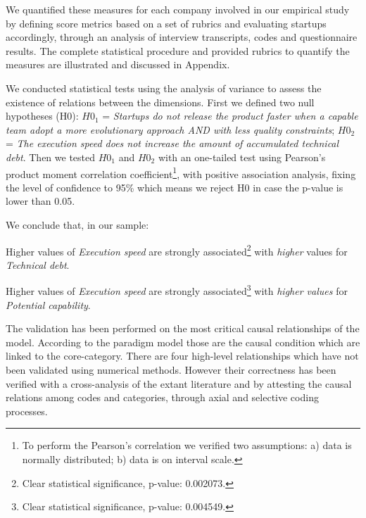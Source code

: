 \documentclass[10pt,journal,letterpaper,compsoc]{IEEEtran}
\begin{document}
We quantified these measures for each company involved in our empirical study 
by defining score metrics based on a set of rubrics and evaluating startups 
accordingly, through an analysis of interview transcripts, codes and 
questionnaire results. The complete statistical procedure and provided rubrics 
to quantify the measures are illustrated and discussed in Appendix.

We conducted statistical tests using the analysis of variance to assess the existence of relations between the dimensions. First we defined two null hypotheses (H0): $H0_1$ = \textit{Startups do not release the product faster when a capable team adopt a more evolutionary approach AND with less quality constraints}; $H0_2$ = \textit{The execution speed does not increase the amount of accumulated technical debt}. Then we tested $H0_1$ and $H0_2$  with an one-tailed test using Pearson's product moment correlation coefficient\footnote{To perform the Pearson's correlation we verified two assumptions: a) data is normally distributed; b) data is on interval scale.}, with positive association analysis, fixing the level of confidence to 95\% which means we reject H0 in case the p-value is lower than 0.05.

We conclude that, in our sample:
\par\vspace {0.4cm}
\begin{compactenum}
\item Higher values of \textit{Execution speed} are strongly associated\footnote{Clear statistical significance, p-value: 0.002073.} with \textit{higher} values for  \textit{Technical debt}.

\item Higher values of  \textit{Execution speed}  are strongly associated\footnote{Clear statistical significance, p-value: 0.004549.} with  \textit{higher values} for  \textit{Potential capability}.
\end{compactenum}
\par\vspace {0.4cm}

The validation has been performed on the most critical  causal relationships of 
the model. According to the paradigm model those are the causal condition which 
are linked to the core-category. There are four high-level relationships  which 
have not been validated using numerical methods. However their correctness has 
been verified with a cross-analysis of the extant literature and by attesting 
the causal relations among codes and categories, through axial and selective 
coding processes. 
\end{document}
